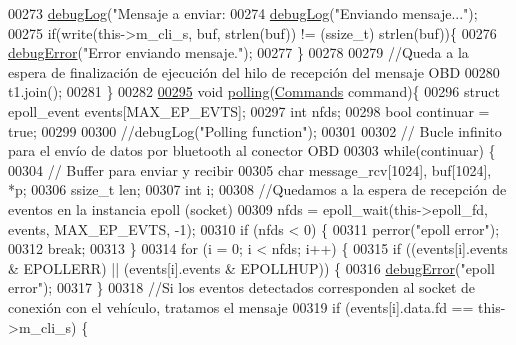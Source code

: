 \begin{DoxyCode}
{{{{{{00273         \hyperlink{debug_8hpp_a55f41cf7b0585224496de3d7adbc101c}{debugLog}(\textcolor{stringliteral}{"Mensaje a enviar: %
00274         \hyperlink{debug_8hpp_a55f41cf7b0585224496de3d7adbc101c}{debugLog}(\textcolor{stringliteral}{"Enviando mensaje..."});
00275         \textcolor{keywordflow}{if}(write(this->m\_cli\_s, buf, strlen(buf)) != (ssize\_t) strlen(buf))\{
00276             \hyperlink{debug_8hpp_a06cd512b8b15b6da31a5a557445f7027}{debugError}(\textcolor{stringliteral}{"Error enviando mensaje."});
00277         \}
00278         
00279         \textcolor{comment}{//Queda a la espera de finalización de ejecución del hilo de recepción del mensaje OBD}
00280         t1.join();
00281     \}
00282 
\hyperlink{classObd_a0792ecb9247f32760269fdf64a178f8f}{00295}     \textcolor{keywordtype}{void} \hyperlink{classObd_a0792ecb9247f32760269fdf64a178f8f}{polling}(\hyperlink{classCommands}{Commands} command)\{
00296         \textcolor{keyword}{struct }epoll\_event events[MAX\_EP\_EVTS];
00297         \textcolor{keywordtype}{int} nfds;
00298         \textcolor{keywordtype}{bool} continuar = \textcolor{keyword}{true};
00299 
00300         \textcolor{comment}{//debugLog("Polling function");}
00301 
00302         \textcolor{comment}{// Bucle infinito para el envío de datos por bluetooth al conector OBD}
00303         \textcolor{keywordflow}{while}(continuar) \{
00304         \textcolor{comment}{// Buffer para enviar y recibir}
00305             \textcolor{keywordtype}{char} message\_rcv[1024], buf[1024], *p;
00306             ssize\_t len;
00307             \textcolor{keywordtype}{int} i;
00308             \textcolor{comment}{//Quedamos a la espera de recepción de eventos en la instancia epoll (socket)}
00309             nfds = epoll\_wait(this->epoll\_fd, events, MAX\_EP\_EVTS, -1);
00310             \textcolor{keywordflow}{if} (nfds < 0) \{
00311                 perror(\textcolor{stringliteral}{"epoll error"});
00312                 \textcolor{keywordflow}{break};
00313             \}
00314             \textcolor{keywordflow}{for} (i = 0; i < nfds; i++) \{
00315                 \textcolor{keywordflow}{if} ((events[i].events & EPOLLERR) || (events[i].events & EPOLLHUP)) \{
00316                     \hyperlink{debug_8hpp_a06cd512b8b15b6da31a5a557445f7027}{debugError}(\textcolor{stringliteral}{"epoll error"});
00317                 \}
00318                 \textcolor{comment}{//Si los eventos detectados corresponden al socket de conexión con el vehículo, tratamos el
       mensaje}
00319                 \textcolor{keywordflow}{if} (events[i].data.fd == this->m\_cli\_s) \{
}}}}}}}
\end{DoxyCode}
